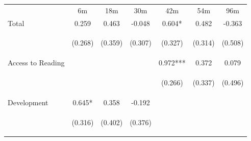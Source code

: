 \begin{tabular}{lcccccc}
\hline \noalign{\smallskip} & 6m & 18m & 30m & 42m & 54m & 96m\\
\noalign{\smallskip}\hline \noalign{\smallskip}Total & 0.259 & 0.463 & -0.048 & 0.604* & 0.482 & -0.363\\
 & \begin{footnotesize}(0.268)\end{footnotesize} & \begin{footnotesize}(0.359)\end{footnotesize} & \begin{footnotesize}(0.307)\end{footnotesize} & \begin{footnotesize}(0.327)\end{footnotesize} & \begin{footnotesize}(0.314)\end{footnotesize} & \begin{footnotesize}(0.508)\end{footnotesize}\\
\noalign{\smallskip}Access to Reading &  &  &  & 0.972*** & 0.372 & 0.079\\
 & \begin{footnotesize}\end{footnotesize} & \begin{footnotesize}\end{footnotesize} & \begin{footnotesize}\end{footnotesize} & \begin{footnotesize}(0.266)\end{footnotesize} & \begin{footnotesize}(0.337)\end{footnotesize} & \begin{footnotesize}(0.496)\end{footnotesize}\\
\noalign{\smallskip}Development & 0.645* & 0.358 & -0.192 &  &  & \\
 & \begin{footnotesize}(0.316)\end{footnotesize} & \begin{footnotesize}(0.402)\end{footnotesize} & \begin{footnotesize}(0.376)\end{footnotesize} & \begin{footnotesize}\end{footnotesize} & \begin{footnotesize}\end{footnotesize} & \begin{footnotesize}\end{footnotesize}\\

\end{tabular}
